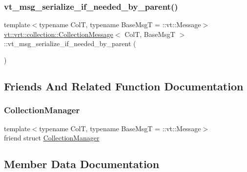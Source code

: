 \subsubsection{\texorpdfstring{vt\+\_\+msg\+\_\+serialize\+\_\+if\+\_\+needed\+\_\+by\+\_\+parent()}{vt\_msg\_serialize\_if\_needed\_by\_parent()}}
{\footnotesize\ttfamily template$<$typename ColT, typename Base\+MsgT = \+::vt\+::\+Message$>$ \\
\hyperlink{structvt_1_1vrt_1_1collection_1_1_collection_message}{vt\+::vrt\+::collection\+::\+Collection\+Message}$<$ ColT, Base\+MsgT $>$\+::vt\+\_\+msg\+\_\+serialize\+\_\+if\+\_\+needed\+\_\+by\+\_\+parent (\begin{DoxyParamCaption}{ }\end{DoxyParamCaption})}



\subsection{Friends And Related Function Documentation}
\mbox{\label{structvt_1_1vrt_1_1collection_1_1_collection_message_af9288b1963f434a90b307b5305a49510}} 
\subsubsection{\texorpdfstring{Collection\+Manager}{CollectionManager}}
{\footnotesize\ttfamily template$<$typename ColT, typename Base\+MsgT = \+::vt\+::\+Message$>$ \\
friend struct \hyperlink{structvt_1_1vrt_1_1collection_1_1_collection_manager}{Collection\+Manager}\hspace{0.3cm}{\ttfamily [friend]}}



\subsection{Member Data Documentation}
\mbox{\label{structvt_1_1vrt_1_1collection_1_1_collection_message_a60590aa9601e302e944e57a28d6d6600}} 
